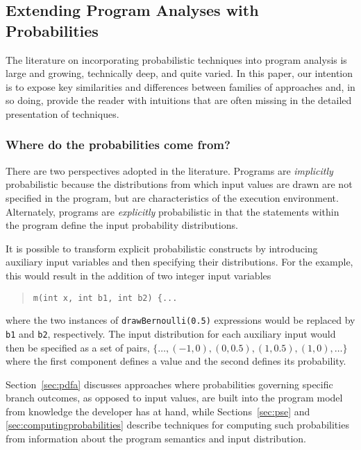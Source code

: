 \subsection{Extending Program Analyses with Probabilities}
\label{sec:overview}

The literature on incorporating probabilistic techniques into 
program analysis is large and growing, technically deep, and quite
varied.  In this paper, our
intention is to expose key similarities and differences between 
families of approaches and, in so doing, provide the reader with
intuitions that are often missing in the detailed presentation of techniques.

\subsubsection{Where do the probabilities come from?}
There are two perspectives adopted in the literature.
Programs are \textit{implicitly} probabilistic because the distributions
from which input values are drawn are not specified in the program,
but are characteristics of the execution environment.
Alternately, programs are \textit{explicitly} probabilistic in 
that the statements
within the program define the input probability distributions.

It is possible to transform explicit probabilistic constructs
by introducing auxiliary input variables and then specifying
their distributions.   For the example, this would result
in the addition of two integer input variables 
\begin{quote}
\texttt{m(int x, int b1, int b2) \{...} 
\end{quote}
where the two instances of
\texttt{drawBernoulli(0.5)} expressions would be replaced
by \texttt{b1} and \texttt{b2}, respectively.  The input
distribution for each auxiliary input would then be specified
as a set of pairs,
$\{ \ldots, (-1,0), (0,0.5), (1,0.5), (1,0), \ldots \}$
where the first component defines a value and the second defines
its probability.

Section~\ref{sec:pdfa} discusses approaches where probabilities
governing specific branch outcomes, as opposed to input values,
are built into the program model from knowledge the developer
has at hand, while Sections~\ref{sec:pse} and \ref{sec:computingprobabilities}
describe techniques for computing such probabilities from information about
the program semantics and input distribution.

